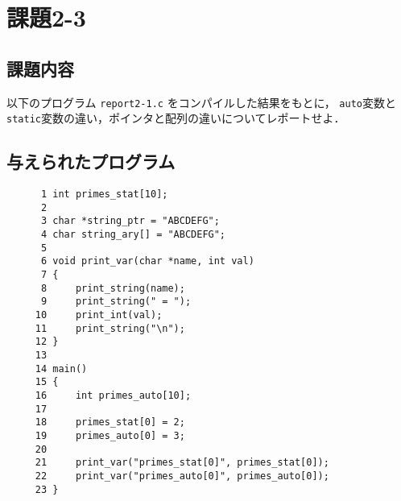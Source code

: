 \documentclass[a4j,11pt]{jarticle}
\begin{document}
\section{課題2-3}
\subsection{課題内容}
以下のプログラム {\tt report2-1.c} をコンパイルした結果をもとに， {\tt auto}変数と{\tt static}変数の違い，ポインタと配列の違いについてレポートせよ．

\subsection{与えられたプログラム}
\begin{verbatim}
      1	int primes_stat[10];
      2	
      3	char *string_ptr = "ABCDEFG";
      4	char string_ary[] = "ABCDEFG";
      5	
      6	void print_var(char *name, int val)
      7	{
      8	    print_string(name);
      9	    print_string(" = ");
     10	    print_int(val);
     11	    print_string("\n");
     12	}
     13	
     14	main()
     15	{
     16	    int primes_auto[10];
     17	
     18	    primes_stat[0] = 2;
     19	    primes_auto[0] = 3;
     20	
     21	    print_var("primes_stat[0]", primes_stat[0]);
     22	    print_var("primes_auto[0]", primes_auto[0]);
     23	}
\end{verbatim}
\end{document}
